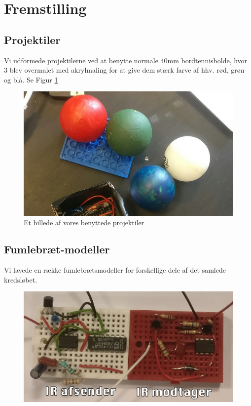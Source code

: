 \section{Fremstilling}
\subsection{Projektiler}
Vi udformede projektilerne ved at benytte normale 40mm bordtennisbolde, hvor 3 blev overmalet med akrylmaling for at give dem stærk farve af hhv. rød, grøn og blå. Se Figur \ref{fig:akrylbolde} 
\begin{figure}[H]
	\centering
    \includegraphics[width=13cm]{figures/2_5fremstilling/akrylbolde.jpeg}
	\caption{Et billede af vores benyttede projektiler}
	\label{fig:akrylbolde}
\end{figure}
\subsection{Fumlebræt-modeller}
Vi lavede en række fumlebrætsmodeller for forskellige dele af det samlede kredsløbet. 
	\begin{figure}[H]
		\centering
	    \includegraphics[width=13cm]{figures/2_5fremstilling/prototyper/DanielChrisKreds.png}
		\caption{}
		\label{fig:}
	\end{figure}
